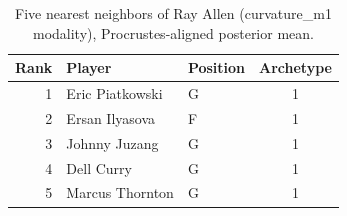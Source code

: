 \begin{table}[htbp]
  \centering\small
  \begin{tabular}{rllc}
    \toprule
    Rank & Player & Position & Archetype \\
    \midrule
    1 & Eric Piatkowski & G & 1 \\
    2 & Ersan Ilyasova & F & 1 \\
    3 & Johnny Juzang & G & 1 \\
    4 & Dell Curry & G & 1 \\
    5 & Marcus Thornton & G & 1 \\
    \bottomrule
  \end{tabular}
  \caption{Five nearest neighbors of Ray Allen (curvature_m1 modality), Procrustes-aligned posterior mean.}
  \label{tab:Ray_Allen_neighbors_curvature_m1}
\end{table}

